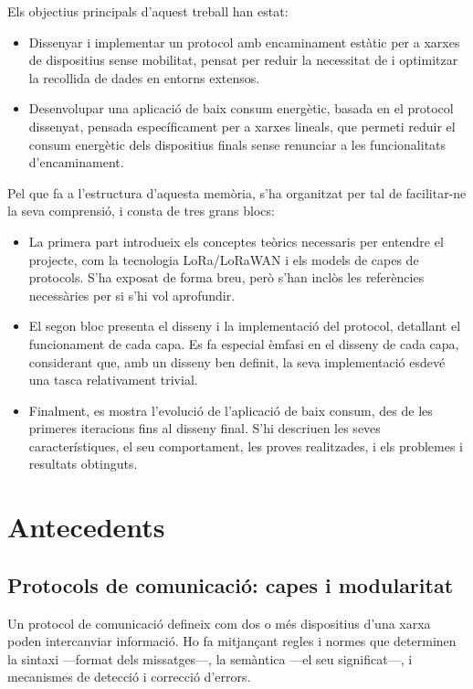 \documentclass{tfgitic}[2024/07/01]
\begin{document}
Els objectius principals d'aquest treball han estat:
\begin{itemize}
    \item Dissenyar i implementar un protocol amb encaminament estàtic per a xarxes de dispositius sense mobilitat, pensat per reduir la necessitat de  i optimitzar la recollida de dades en entorns extensos.
    \item Desenvolupar una aplicació de baix consum energètic, basada en el protocol dissenyat, pensada específicament per a xarxes lineals, que permeti reduir el consum energètic dels dispositius finals sense renunciar a les funcionalitats d'encaminament.
\end{itemize}

Pel que fa a l'estructura d'aquesta memòria, s'ha organitzat per tal de facilitar-ne la seva comprensió, i consta de tres grans blocs:
\begin{itemize}
    \item La primera part introdueix els conceptes teòrics necessaris per entendre el projecte, com la tecnologia LoRa/LoRaWAN i els models de capes de protocols. S'ha exposat de forma breu, però s'han inclòs les referències necessàries per si s'hi vol aprofundir.
    \item El segon bloc presenta el disseny i la implementació del protocol, detallant el funcionament de cada capa. Es fa especial èmfasi en el disseny de cada capa, considerant que, amb un disseny ben definit, la seva implementació esdevé una tasca relativament trivial.
    \item Finalment, es mostra l'evolució de l'aplicació de baix consum, des de les primeres iteracions fins al disseny final. S'hi descriuen les seves característiques, el seu comportament, les proves realitzades, i els problemes i resultats obtinguts.
\end{itemize}

\chapter{Antecedents}
\section{Protocols de comunicació: capes i modularitat}
\label{sec:protocols}
Un protocol de comunicació defineix com dos o més dispositius d'una xarxa poden intercanviar informació. Ho fa mitjançant regles i normes que determinen la sintaxi ---format dels missatges---, la semàntica ---el seu significat---, i mecanismes de detecció i correcció d'errors.
\end{document}
